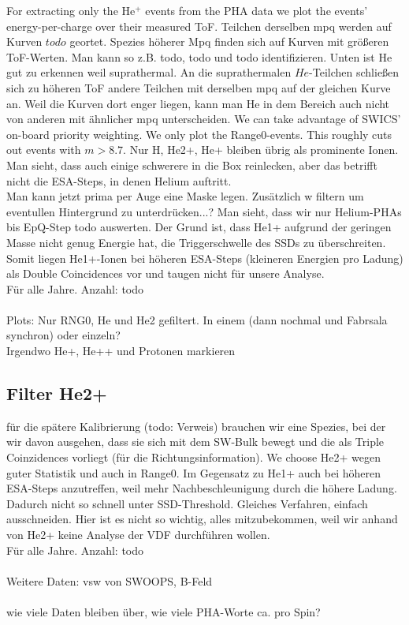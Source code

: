 For extracting only the $\mathrm{He^+}$ events from the PHA data we plot the events' energy-per-charge over their measured ToF. 
Teilchen derselben mpq werden auf Kurven $todo$ geortet. Spezies höherer Mpq finden sich auf Kurven mit größeren ToF-Werten. Man kann so z.B. todo, todo und todo identifizieren. Unten ist He gut zu erkennen weil suprathermal. An die suprathermalen $He$-Teilchen schließen sich zu höheren ToF andere Teilchen mit derselben mpq auf der gleichen Kurve an. Weil die Kurven dort enger liegen, kann man He in dem Bereich auch nicht von anderen mit ähnlicher mpq unterscheiden.
We can take advantage of SWICS' on-board priority weighting. We only plot the Range0-events. This roughly cuts out events with $m>8.7$. Nur H, He2+, He+ bleiben übrig als prominente Ionen. Man sieht, dass auch einige schwerere in die Box reinlecken, aber das betrifft nicht die ESA-Steps, in denen Helium auftritt.\\
Man kann jetzt prima per Auge eine Maske legen. Zusätzlich w filtern um eventullen Hintergrund zu unterdrücken...?
Man sieht, dass wir nur Helium-PHAs bis EpQ-Step todo auswerten. Der Grund ist, dass He1+ aufgrund der geringen Masse nicht genug Energie hat, die Triggerschwelle des SSDs zu überschreiten. Somit liegen He1+-Ionen bei höheren ESA-Steps (kleineren Energien pro Ladung) als Double Coincidences vor und taugen nicht für unsere Analyse.
\\
Für alle Jahre. Anzahl: todo
\\ \\
Plots: Nur RNG0, He und He2 gefiltert. In einem (dann nochmal und Fabrsala synchron) oder einzeln?
\\
Irgendwo He+, He++ und Protonen markieren


\subsection{Filter He2+}
für die spätere Kalibrierung (todo: Verweis) brauchen wir eine Spezies, bei der wir davon ausgehen, dass sie sich mit dem SW-Bulk bewegt und die als Triple Coinzidences vorliegt (für die Richtungsinformation). We choose He2+ wegen guter Statistik und auch in Range0. Im Gegensatz zu He1+ auch bei höheren ESA-Steps anzutreffen, weil mehr Nachbeschleunigung durch die höhere Ladung. Dadurch nicht so schnell unter SSD-Threshold. Gleiches Verfahren, einfach ausschneiden. Hier ist es nicht so wichtig, alles mitzubekommen, weil wir anhand von He2+ keine Analyse der VDF durchführen wollen. 
\\
Für alle Jahre. Anzahl: todo
\\ \\
Weitere Daten: vsw von SWOOPS, B-Feld
\\ \\
wie viele Daten bleiben über, wie viele PHA-Worte ca. pro Spin?


